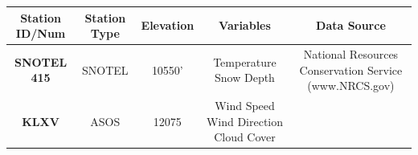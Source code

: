 \documentclass[11pt]{article}
\begin{document}
\begin{longtable}[]{@{}ccccc@{}}
\toprule
\begin{minipage}[b]{0.18\columnwidth}\centering\strut
\textbf{Station ID/Num}\strut
\end{minipage} & \begin{minipage}[b]{0.18\columnwidth}\centering\strut
\textbf{Station Type}\strut
\end{minipage} & \begin{minipage}[b]{0.17\columnwidth}\centering\strut
\textbf{Elevation}\strut
\end{minipage} & \begin{minipage}[b]{0.15\columnwidth}\centering\strut
\textbf{Variables}\strut
\end{minipage} & \begin{minipage}[b]{0.18\columnwidth}\centering\strut
\textbf{Data Source}\strut
\end{minipage}\tabularnewline
\midrule
\endhead
\begin{minipage}[t]{0.18\columnwidth}\centering\strut
\textbf{SNOTEL 415}\strut
\end{minipage} & \begin{minipage}[t]{0.18\columnwidth}\centering\strut
SNOTEL\strut
\end{minipage} & \begin{minipage}[t]{0.17\columnwidth}\centering\strut
10550'\strut
\end{minipage} & \begin{minipage}[t]{0.15\columnwidth}\centering\strut
Temperature Snow Depth\strut
\end{minipage} & \begin{minipage}[t]{0.18\columnwidth}\centering\strut
National Resources Conservation Service (www.NRCS.gov)\strut
\end{minipage}\tabularnewline
\begin{minipage}[t]{0.18\columnwidth}\centering\strut
\textbf{KLXV}\strut
\end{minipage} & \begin{minipage}[t]{0.18\columnwidth}\centering\strut
ASOS\strut
\end{minipage} & \begin{minipage}[t]{0.17\columnwidth}\centering\strut
12075\strut
\end{minipage} & \begin{minipage}[t]{0.15\columnwidth}\centering\strut
Wind Speed Wind Direction Cloud Cover\strut
\end{minipage} & \begin{minipage}[t]{0.18\columnwidth}\centering\strut

\end{minipage}
\end{longtable}
\end{document}
